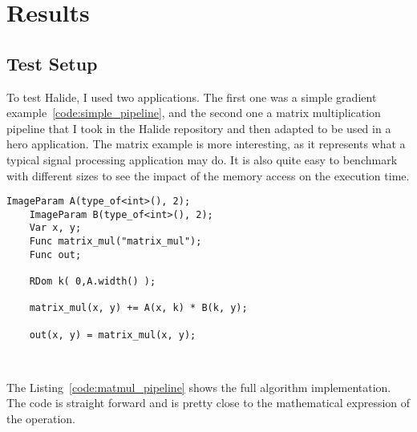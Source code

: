 
\chapter{Results}
\section{Test Setup}
	To test Halide, I used two applications. The first one was a simple gradient example~\ref{code:simple_pipeline},
	and the second one a matrix multiplication pipeline that I took in the Halide repository and then adapted to be used in a hero application.
The matrix example is more interesting, as it represents what a typical signal processing application may do. It is also quite easy to benchmark with different sizes to see the impact of the memory access on the execution time.

\lstset{basicstyle=\ttfamily\footnotesize,breaklines=true,tabsize=2}
\begin{lstlisting}[caption={Matrix Multiplication Pipeline.}, captionpos=b, label={code:matmul_pipeline}]
    ImageParam A(type_of<int>(), 2);
    ImageParam B(type_of<int>(), 2);
    Var x, y;
    Func matrix_mul("matrix_mul");
    Func out;

    RDom k( 0,A.width() );

    matrix_mul(x, y) += A(x, k) * B(k, y);

    out(x, y) = matrix_mul(x, y);



\end{lstlisting}
    The Listing~\ref{code:matmul_pipeline} shows the full algorithm implementation. The code is straight forward and is pretty close to the mathematical expression of the operation.


